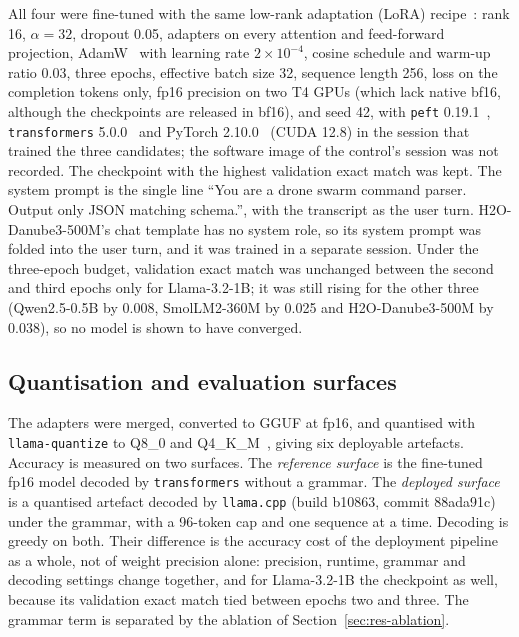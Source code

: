 \documentclass[a4paper,fleqn]{cas-dc}
\newcommand{\QF}{Q4\_K\_M}
\newcommand{\QE}{Q8\_0}
\begin{document}
All four were fine-tuned with the same low-rank adaptation (LoRA) recipe~\citep{lora}: rank 16, $\alpha = 32$, dropout
0.05, adapters on every attention and feed-forward projection, AdamW~\citep{adamw} with learning
rate $2\times10^{-4}$, cosine schedule and warm-up ratio 0.03, three epochs, effective batch size
32, sequence length 256, loss on the completion tokens only, fp16 precision on two T4 GPUs
(which lack native bf16, although the checkpoints are released in bf16), and
seed 42, with \texttt{peft} 0.19.1~\citep{peft}, \texttt{transformers} 5.0.0~\citep{transformers} and PyTorch 2.10.0~\citep{pytorch} (CUDA 12.8)
in the session that trained the three candidates; the software image of the control's session was
not recorded. The checkpoint with the highest validation exact match was kept. The system prompt is
the single line ``You are a drone swarm command parser. Output only JSON matching schema.'', with
the transcript as the user turn. H2O-Danube3-500M's chat template has no system role, so its
system prompt was folded into the user turn, and it was trained in a separate session. Under the
three-epoch budget, validation exact match was unchanged between the second and third epochs only
for Llama-3.2-1B; it was still rising for the other three (Qwen2.5-0.5B by 0.008, SmolLM2-360M by
0.025 and H2O-Danube3-500M by 0.038), so no model is shown to have converged.

\subsection{Quantisation and evaluation surfaces}
\label{sec:surfaces}

The adapters were merged, converted to GGUF at fp16, and quantised with \texttt{llama-quantize}
to \QE{} and \QF{}~\citep{llamacpp}, giving six deployable artefacts. Accuracy is measured on two
surfaces. The \emph{reference surface} is the fine-tuned fp16 model decoded by
\texttt{transformers} without a grammar. The \emph{deployed surface} is a quantised artefact
decoded by \texttt{llama.cpp} (build b10863, commit 88ada91c) under the grammar, with a 96-token cap and one
sequence at a time. Decoding is greedy on both. Their difference is the accuracy cost of the
deployment pipeline as a whole, not of weight precision alone: precision, runtime, grammar and
decoding settings change together, and for Llama-3.2-1B the checkpoint as well, because its
validation exact match tied between epochs two and three. The grammar term is separated by the
ablation of Section~\ref{sec:res-ablation}.
\end{document}

